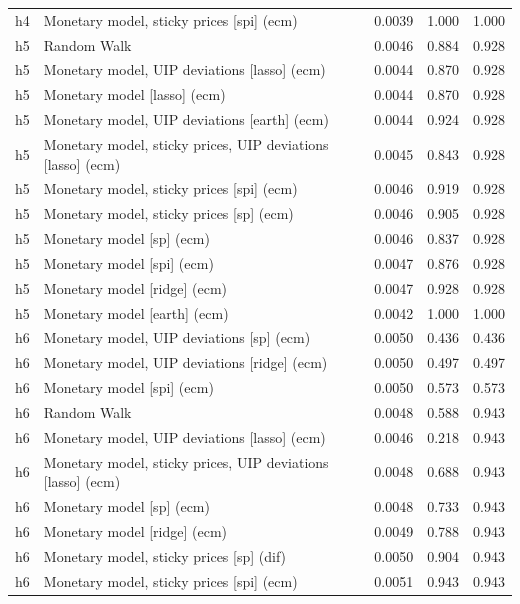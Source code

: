 \begin{ThreePartTable}
\begin{longtable}[t]{cp{5.5cm}ccc}
h4 & \raggedright Monetary model, sticky prices [spi] (ecm) & 0.0039 & 1.000 & 1.000\\
\addlinespace
h5 & \raggedright Random Walk & 0.0046 & 0.884 & 0.928\\
h5 & \raggedright Monetary model, UIP deviations [lasso] (ecm) & 0.0044 & 0.870 & 0.928\\
h5 & \raggedright Monetary model [lasso] (ecm) & 0.0044 & 0.870 & 0.928\\
h5 & \raggedright Monetary model, UIP deviations [earth] (ecm) & 0.0044 & 0.924 & 0.928\\
h5 & \raggedright Monetary model, sticky prices, UIP deviations [lasso] (ecm) & 0.0045 & 0.843 & 0.928\\
h5 & \raggedright Monetary model, sticky prices [spi] (ecm) & 0.0046 & 0.919 & 0.928\\
h5 & \raggedright Monetary model, sticky prices [sp] (ecm) & 0.0046 & 0.905 & 0.928\\
h5 & \raggedright Monetary model [sp] (ecm) & 0.0046 & 0.837 & 0.928\\
h5 & \raggedright Monetary model [spi] (ecm) & 0.0047 & 0.876 & 0.928\\
h5 & \raggedright Monetary model [ridge] (ecm) & 0.0047 & 0.928 & 0.928\\
h5 & \raggedright Monetary model [earth] (ecm) & 0.0042 & 1.000 & 1.000\\
\addlinespace
h6 & \raggedright Monetary model, UIP deviations [sp] (ecm) & 0.0050 & 0.436 & 0.436\\
h6 & \raggedright Monetary model, UIP deviations [ridge] (ecm) & 0.0050 & 0.497 & 0.497\\
h6 & \raggedright Monetary model [spi] (ecm) & 0.0050 & 0.573 & 0.573\\
h6 & \raggedright Random Walk & 0.0048 & 0.588 & 0.943\\
h6 & \raggedright Monetary model, UIP deviations [lasso] (ecm) & 0.0046 & 0.218 & 0.943\\
h6 & \raggedright Monetary model, sticky prices, UIP deviations [lasso] (ecm) & 0.0048 & 0.688 & 0.943\\
h6 & \raggedright Monetary model [sp] (ecm) & 0.0048 & 0.733 & 0.943\\
h6 & \raggedright Monetary model [ridge] (ecm) & 0.0049 & 0.788 & 0.943\\
h6 & \raggedright Monetary model, sticky prices [sp] (dif) & 0.0050 & 0.904 & 0.943\\
h6 & \raggedright Monetary model, sticky prices [spi] (ecm) & 0.0051 & 0.943 & 0.943\\

\end{longtable}
\end{ThreePartTable}
